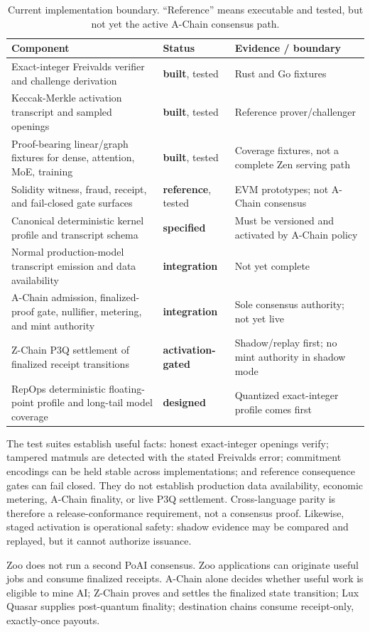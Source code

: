 \begin{table}[h]
\centering
\caption{Current implementation boundary. ``Reference'' means executable and tested, but
not yet the active A-Chain consensus path.}
\label{tab:status-summary}
\small
\begin{tabular}{@{}p{7.4cm}p{2.4cm}p{3.8cm}@{}}
\toprule
Component & Status & Evidence / boundary \\
\midrule
Exact-integer Freivalds verifier and challenge derivation
  & \textbf{built}, tested & Rust and Go fixtures \\
Keccak-Merkle activation transcript and sampled openings
  & \textbf{built}, tested & Reference prover/challenger \\
Proof-bearing linear/graph fixtures for dense, attention, MoE, training
  & \textbf{built}, tested & Coverage fixtures, not a complete Zen serving path \\
Solidity witness, fraud, receipt, and fail-closed gate surfaces
  & \textbf{reference}, tested & EVM prototypes; not A-Chain consensus \\
Canonical deterministic kernel profile and transcript schema
  & \textbf{specified} & Must be versioned and activated by A-Chain policy \\
Normal production-model transcript emission and data availability
  & \textbf{integration} & Not yet complete \\
A-Chain admission, finalized-proof gate, nullifier, metering, and mint authority
  & \textbf{integration} & Sole consensus authority; not yet live \\
Z-Chain P3Q settlement of finalized receipt transitions
  & \textbf{activation-gated} & Shadow/replay first; no mint authority in shadow mode \\
RepOps deterministic floating-point profile and long-tail model coverage
  & \textbf{designed} & Quantized exact-integer profile comes first \\
\bottomrule
\end{tabular}
\end{table}

The test suites establish useful facts: honest exact-integer openings verify; tampered
matmuls are detected with the stated Freivalds error; commitment encodings can be held
stable across implementations; and reference consequence gates can fail closed. They do
not establish production data availability, economic metering, A-Chain finality, or live
P3Q settlement. Cross-language parity is therefore a release-conformance requirement,
not a consensus proof. Likewise, staged activation is operational safety: shadow evidence
may be compared and replayed, but it cannot authorize issuance.

Zoo does not run a second PoAI consensus. Zoo applications can originate useful jobs and
consume finalized receipts. A-Chain alone decides whether useful work is eligible to mine
\textsc{AI}; Z-Chain proves and settles the finalized state transition; Lux Quasar supplies
post-quantum finality; destination chains consume receipt-only, exactly-once payouts.
